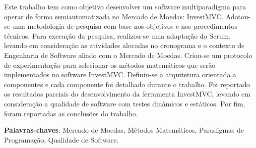 \begin{resumo}

Este trabalho tem como objetivo desenvolver um software multiparadigma para operar
de forma semiautomatizada no Mercado de Moedas: InvestMVC. Adotou-se uma metodologia de pesquisa com base nos objetivos e nos procedimentos técnicos. Para execução da pesquisa, realizou-se uma adaptação do Scrum, levando em consideração as atividades
alocadas no cronograma e o contexto de Engenharia de Software aliado com o Mercado de
Moedas. Criou-se um protocolo de experimentação para selecionar os métodos matemáticos que serão implementados no software InvestMVC. Definiu-se a arquitetura orientada a componentes e cada componente foi detalhado durante o trabalho. Foi reportado os resultados parciais do desenvolvimento da ferramenta InvestMVC, levando em consideração a qualidade de software com testes dinâmicos e estáticos. Por fim, foram reportadas as conclusões do trabalho.

\vspace{\onelineskip}
    
 \noindent
 \textbf{Palavras-chaves}: Mercado de Moedas, Métodos Matemáticos, Paradigmas de Programação, Qualidade de Software.
\end{resumo}
